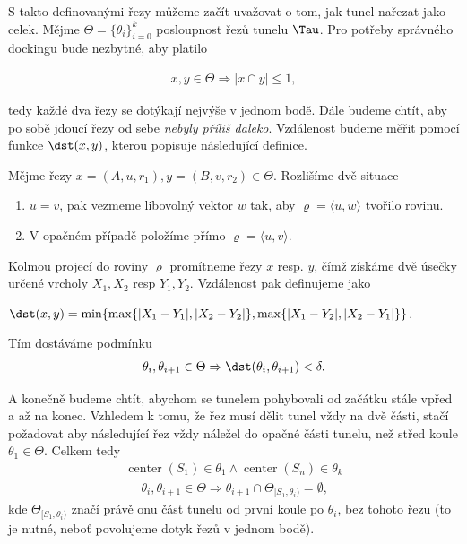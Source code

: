 S takto definovanými řezy můžeme začít uvažovat o tom, jak tunel nařezat jako celek.
Mějme $ \Theta = \{\theta_i\}_{i=0}^{k}$ posloupnost řezů tunelu $ \Tau $. Pro potřeby správného
dockingu bude nezbytné, aby platilo

\begin{align}
x, y \in \Theta \Rightarrow |x \cap y| \leq 1, \label{cond:not_intersecting}
\end{align}

tedy každé dva řezy se dotýkají nejvýše v jednom bodě. Dále budeme chtít, aby po sobě
jdoucí řezy od sebe \textit{nebyly příliš daleko}. Vzdálenost budeme měřit pomocí funkce
$ \dst(x, y) $, kterou popisuje následující definice.

\begin{defi}
Mějme řezy $ x = (A, u, r_1), y = (B, v, r_2) \in \Theta $. Rozlišíme dvě situace
    \begin{enumerate}[label={(\arabic*)}]
        \item $ u = v $, pak vezmeme libovolný vektor $ w $ tak, aby
            $ \varrho = \langle u, w \rangle $ tvořilo rovinu.
        \item V opačném případě položíme přímo $ \varrho = \langle u, v \rangle $.
    \end{enumerate}
Kolmou projecí do roviny $ \varrho $ promítneme řezy $x $ resp. $y$, čímž získáme dvě úsečky
určené vrcholy $X_1, X_2 $ resp $Y_1, Y_2 $. Vzdálenost pak definujeme jako
    \begin{center}
        $ \dst(x, y) = \min\{ \max\{|X_1 - Y_1|, |X_2 - Y_2|\}, \max\{|X_1 - Y_2|, |X_2 - Y_1|\}\}$.
    \end{center}
\end{defi}

Tím dostáváme podmínku
\begin{align}
    \theta_i, \theta_{i+1} \in \Theta \Rightarrow \dst(\theta_i, \theta_{i+1}) < \delta.
    \label{cond:distance}
\end{align}

A konečně budeme chtít, abychom se tunelem pohybovali od začátku stále vpřed
a až na konec.
Vzhledem k tomu, že řez musí dělit tunel vždy na dvě části, stačí požadovat
aby následující řez vždy náležel do opačné části tunelu, než střed koule
$ \theta_1 \in \Theta $. Celkem tedy
\begin{align}
    \operatorname{center}(S_1) \in \theta_1 \wedge \operatorname{center}(S_n) \in \theta_k
\end{align}
\begin{align}
    \theta_i, \theta_{i+1} \in \Theta
        \Rightarrow \theta_{i+1} \cap \Theta_{[S_1, \theta_i)} = \emptyset \text{,}
        \label{cond:going_forward}
\end{align}
kde $ \Theta_{[S_1, \theta_i)} $ značí právě onu část tunelu od první koule po
$ \theta_i $, bez tohoto řezu (to je nutné, neboť povolujeme dotyk řezů v jednom bodě).

